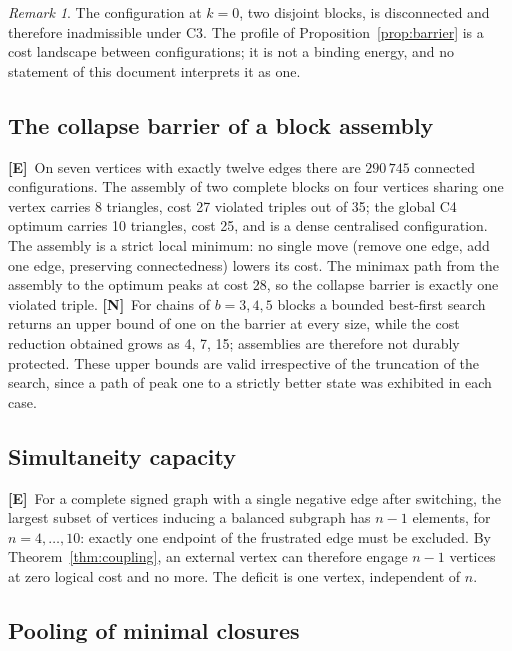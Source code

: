 \documentclass[11pt,a4paper]{article}
\theoremstyle{plain}
\theoremstyle{definition}
\theoremstyle{remark}
\newtheorem{remark}[theorem]{Remark}
\newcommand{\statE}{\textbf{[E]}}
\newcommand{\statN}{\textbf{[N]}}
\begin{document}
\begin{remark}
The configuration at $k=0$, two disjoint blocks, is disconnected and therefore inadmissible under C3. The profile of Proposition~\ref{prop:barrier} is a cost landscape between configurations; it is not a binding energy, and no statement of this document interprets it as one.
\end{remark}

\subsection{The collapse barrier of a block assembly}

\statE\ On seven vertices with exactly twelve edges there are $290\,745$ connected configurations. The assembly of two complete blocks on four vertices sharing one vertex carries 8 triangles, cost 27 violated triples out of 35; the global C4 optimum carries 10 triangles, cost 25, and is a dense centralised configuration. The assembly is a strict local minimum: no single move (remove one edge, add one edge, preserving connectedness) lowers its cost. The minimax path from the assembly to the optimum peaks at cost 28, so the collapse barrier is exactly one violated triple. \statN\ For chains of $b=3,4,5$ blocks a bounded best-first search returns an upper bound of one on the barrier at every size, while the cost reduction obtained grows as 4, 7, 15; assemblies are therefore not durably protected. These upper bounds are valid irrespective of the truncation of the search, since a path of peak one to a strictly better state was exhibited in each case.

\subsection{Simultaneity capacity}

\statE\ For a complete signed graph with a single negative edge after switching, the largest subset of vertices inducing a balanced subgraph has $n-1$ elements, for $n=4,\dots,10$: exactly one endpoint of the frustrated edge must be excluded. By Theorem~\ref{thm:coupling}, an external vertex can therefore engage $n-1$ vertices at zero logical cost and no more. The deficit is one vertex, independent of $n$.

\subsection{Pooling of minimal closures}
\end{document}
